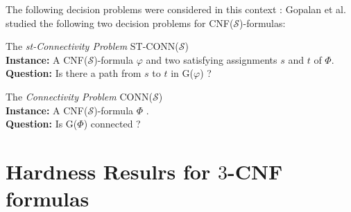 The following decision problems were considered in this context :
Gopalan et al. studied the following two decision problems for CNF($\mathcal{S}$)-formulas:

\begin{flushleft}
    The \textit{st-Connectivity Problem} ST-CONN($\mathcal{S}$) \\
    \textbf{Instance: } A CNF($\mathcal{S}$)-formula $\varphi$ and two satisfying assignments $s$ and $t$ of $\Phi$. \\
    \textbf{Question: } Is there a path from $s$ to $t$ in G($\varphi$) ? \\
\end{flushleft}

\begin{flushleft}
    The \textit{Connectivity Problem} CONN($\mathcal{S}$) \\
    \textbf{Instance: } A CNF($\mathcal{S}$)-formula $\Phi$ . \\
    \textbf{Question: } Is G($\Phi$) connected ? \\
\end{flushleft}




\section{Hardness Resulrs for $3$-CNF formulas}







